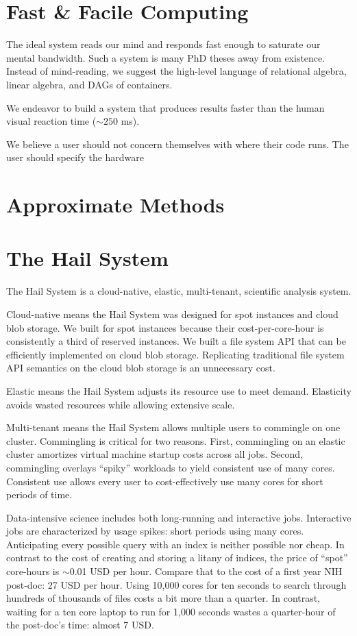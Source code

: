 \documentclass[10pt]{article}
\begin{document}
\section{Fast \& Facile Computing}

The ideal system reads our mind and responds fast enough to saturate our mental bandwidth.
Such a system is many PhD theses away from existence.
Instead of mind-reading, we suggest the high-level language of relational algebra, linear algebra, and DAGs of containers.

We endeavor to build a system that produces results faster than the human visual reaction time ($\sim250$ ms).

We believe a user should not concern themselves with where their code runs.
The user should specify the hardware 

\section{Approximate Methods}

\section{The Hail System}

The Hail System is a cloud-native, elastic, multi-tenant, scientific analysis system.

Cloud-native means the Hail System was designed for spot instances and cloud blob storage.
We built for spot instances because their cost-per-core-hour is consistently a third of reserved instances.
We built a file system API that can be efficiently implemented on cloud blob storage.
Replicating traditional file system API semantics on the cloud blob storage is an unnecessary cost.

Elastic means the Hail System adjusts its resource use to meet demand.
Elasticity avoids wasted resources while allowing extensive scale.

Multi-tenant means the Hail System allows multiple users to commingle on one cluster.
Commingling is critical for two reasons.
First, commingling on an elastic cluster amortizes virtual machine startup costs across all jobs.
Second, commingling overlays ``spiky'' workloads to yield consistent use of many cores.
Consistent use allows every user to cost-effectively use many cores for short periods of time.

Data-intensive science includes both long-running and interactive jobs.
Interactive jobs are characterized by usage spikes: short periods using many cores.
Anticipating every possible query with an index is neither possible nor cheap.
In contrast to the cost of creating and storing a litany of indices, the price of ``spot'' core-hours is $\sim$0.01 USD per hour.
Compare that to the cost of a first year NIH post-doc: 27 USD per hour.
Using 10,000 cores for ten seconds to search through hundreds of thousands of files costs a bit more than a quarter.
In contrast, waiting for a ten core laptop to run for 1,000 seconds wastes a quarter-hour of the post-doc's time: almost 7 USD.
\end{document}
